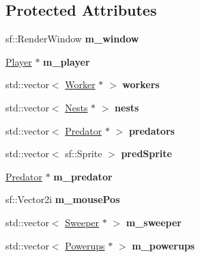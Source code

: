 \subsection*{Protected Attributes}
\begin{DoxyCompactItemize}
\item 
\mbox{\label{class_game_a22a61b5ea27c609be8cf2724c33d7ae5}} 
sf\+::\+Render\+Window {\bfseries m\+\_\+window}
\item 
\mbox{\label{class_game_a371bdca8d00e1837a11a06e59fa9f44a}} 
\mbox{\hyperlink{class_player}{Player}} $\ast$ {\bfseries m\+\_\+player}
\item 
\mbox{\label{class_game_adfcf58551ecd8d9c2462f745a667499d}} 
std\+::vector$<$ \mbox{\hyperlink{class_worker}{Worker}} $\ast$ $>$ {\bfseries workers}
\item 
\mbox{\label{class_game_ad98d9aa32853b70314715f6c4e86fc67}} 
std\+::vector$<$ \mbox{\hyperlink{class_nests}{Nests}} $\ast$ $>$ {\bfseries nests}
\item 
\mbox{\label{class_game_a2eb8d42aba87f93484eed7c5976705ea}} 
std\+::vector$<$ \mbox{\hyperlink{class_predator}{Predator}} $\ast$ $>$ {\bfseries predators}
\item 
\mbox{\label{class_game_a931d6d28ce8bc12baae244f89b153952}} 
std\+::vector$<$ sf\+::\+Sprite $>$ {\bfseries pred\+Sprite}
\item 
\mbox{\label{class_game_ac4dd416633ffdde44e4c7c642dafecd4}} 
\mbox{\hyperlink{class_predator}{Predator}} $\ast$ {\bfseries m\+\_\+predator}
\item 
\mbox{\label{class_game_abe9795084351ad1ff08bf0cf0e9cb88b}} 
sf\+::\+Vector2i {\bfseries m\+\_\+mouse\+Pos}
\item 
\mbox{\label{class_game_aed075e7db53f65d82e190df72c0a5a0b}} 
std\+::vector$<$ \mbox{\hyperlink{class_sweeper}{Sweeper}} $\ast$ $>$ {\bfseries m\+\_\+sweeper}
\item 
\mbox{\label{class_game_acf5df8c39aef66d1365c6be21af87611}} 
std\+::vector$<$ \mbox{\hyperlink{class_powerups}{Powerups}} $\ast$ $>$ {\bfseries m\+\_\+powerups}

\end{DoxyCompactItemize}
